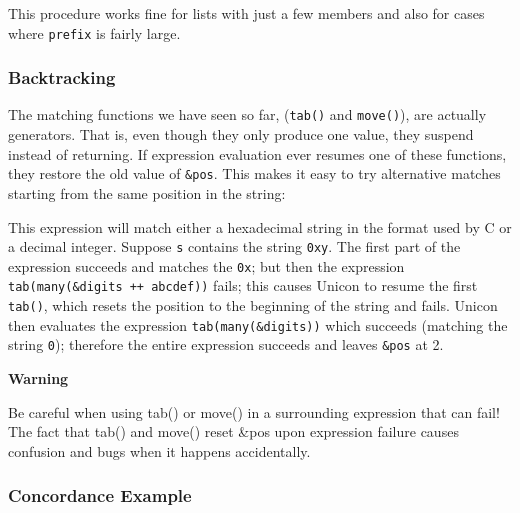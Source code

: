 
This procedure works fine for lists with just a few members and also for
cases where \texttt{prefix} is fairly large.

\subsubsection[Backtracking]{Backtracking}
The matching functions we have seen so far,
(\texttt{tab()} and \texttt{move()}), are actually
generators. That is, even though they only produce one
value, they suspend instead of returning. If expression evaluation ever
resumes one of these functions, they restore the old value of
\texttt{\&pos}. This makes it easy to try alternative matches starting
from the same position in the string:


This expression will match either a hexadecimal string in the format
used by C or a decimal integer. Suppose \texttt{s} contains the string
\texttt{{\textquotedbl}0xy{\textquotedbl}}. The first part of the
expression succeeds and matches the
\texttt{{\textquotedbl}0x{\textquotedbl}}; but then the expression
\texttt{tab(many(\&digits ++
{\textquotesingle}abcdef{\textquotesingle}))} fails; this causes Unicon
to resume the first \texttt{tab()}, which resets the position to the
beginning of the string and fails. Unicon then evaluates the expression
\texttt{tab(many(\&digits))} which succeeds (matching the string
\texttt{{\textquotedbl}0{\textquotedbl}}); therefore the entire
expression succeeds and leaves \texttt{\&pos} at 2.

{\sffamily\bfseries
Warning}

{\sffamily
Be careful when using tab() or move() in a surrounding expression that
can fail! The fact that tab() and move() reset \&pos upon expression
failure causes confusion and bugs when it happens accidentally.}

\subsubsection{Concordance Example}

